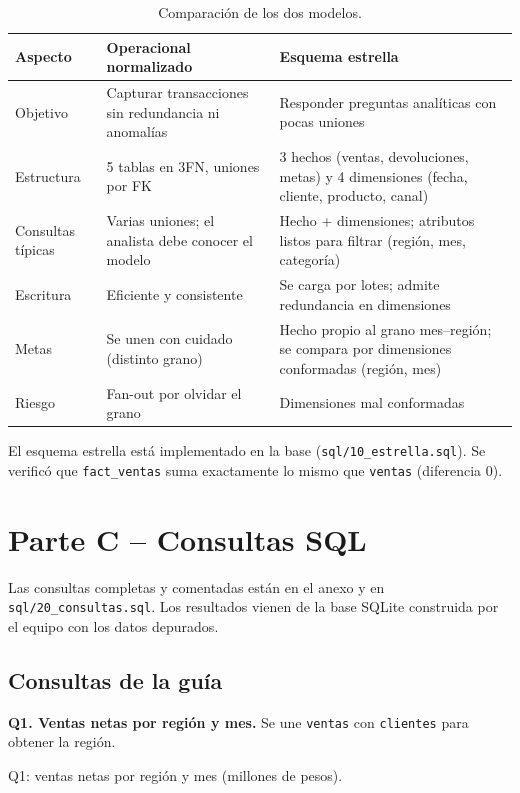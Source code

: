 \documentclass[11pt,letterpaper]{article}
\begin{document}
\begin{table}[H]
\centering
\caption{Comparación de los dos modelos.}
\begin{tabularx}{\linewidth}{l L L}
\toprule
Aspecto & Operacional normalizado & Esquema estrella \\
\midrule
Objetivo & Capturar transacciones sin redundancia ni anomalías & Responder preguntas analíticas con pocas uniones \\
Estructura & 5 tablas en 3FN, uniones por FK & 3 hechos (ventas, devoluciones, metas) y 4 dimensiones (fecha, cliente, producto, canal) \\
Consultas típicas & Varias uniones; el analista debe conocer el modelo & Hecho + dimensiones; atributos listos para filtrar (región, mes, categoría) \\
Escritura & Eficiente y consistente & Se carga por lotes; admite redundancia en dimensiones \\
Metas & Se unen con cuidado (distinto grano) & Hecho propio al grano mes--región; se compara por dimensiones conformadas (región, mes) \\
Riesgo & Fan-out por olvidar el grano & Dimensiones mal conformadas \\
\bottomrule
\end{tabularx}
\end{table}

El esquema estrella está implementado en la base (\texttt{sql/10\_estrella.sql}). Se verificó que
\texttt{fact\_ventas} suma exactamente lo mismo que \texttt{ventas} (diferencia 0).

\section{Parte C -- Consultas SQL}

Las consultas completas y comentadas están en el anexo y en \texttt{sql/20\_consultas.sql}. Los resultados vienen
de la base SQLite construida por el equipo con los datos depurados.

\subsection{Consultas de la guía}

\textbf{Q1. Ventas netas por región y mes.} Se une \texttt{ventas} con \texttt{clientes} para obtener la región.

\begin{table}[H]
\centering
\caption{Q1: ventas netas por región y mes (millones de pesos).}
\small

\end{table}
\end{document}

